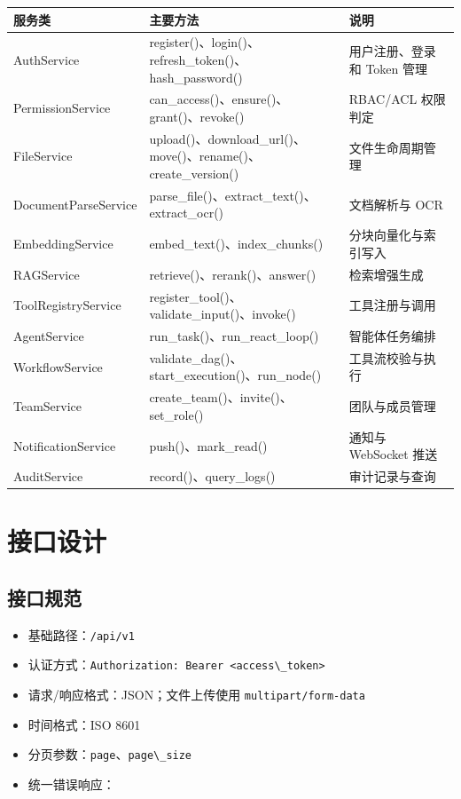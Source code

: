 \documentclass[a4paper,zihao=-4]{ctexart}
\providecommand{\tightlist}{%
  \setlength{\itemsep}{0pt}\setlength{\parskip}{0pt}}
\providecommand{\passthrough}[1]{#1}
\begin{document}
\begin{longtable}{|>{\raggedright\arraybackslash}p{2.4cm}|>{\raggedright\arraybackslash}p{\dimexpr(\linewidth-2.4cm-6\tabcolsep-4\arrayrulewidth)/2\relax}|>{\raggedright\arraybackslash}p{\dimexpr(\linewidth-2.4cm-6\tabcolsep-4\arrayrulewidth)/2\relax}|}
\hline
服务类 & 主要方法 & 说明\tabularnewline
\hline
\endhead
AuthService & register()、login()、refresh\_token()、hash\_password() & 用户注册、登录和 Token 管理\tabularnewline
\hline
PermissionService & can\_access()、ensure()、grant()、revoke() & RBAC/ACL 权限判定\tabularnewline
\hline
FileService & upload()、download\_url()、move()、rename()、create\_version() & 文件生命周期管理\tabularnewline
\hline
DocumentParseService & parse\_file()、extract\_text()、extract\_ocr() & 文档解析与 OCR\tabularnewline
\hline
EmbeddingService & embed\_text()、index\_chunks() & 分块向量化与索引写入\tabularnewline
\hline
RAGService & retrieve()、rerank()、answer() & 检索增强生成\tabularnewline
\hline
ToolRegistryService & register\_tool()、validate\_input()、invoke() & 工具注册与调用\tabularnewline
\hline
AgentService & run\_task()、run\_react\_loop() & 智能体任务编排\tabularnewline
\hline
WorkflowService & validate\_dag()、start\_execution()、run\_node() & 工具流校验与执行\tabularnewline
\hline
TeamService & create\_team()、invite()、set\_role() & 团队与成员管理\tabularnewline
\hline
NotificationService & push()、mark\_read() & 通知与 WebSocket 推送\tabularnewline
\hline
AuditService & record()、query\_logs() & 审计记录与查询\tabularnewline
\hline
\end{longtable}

\hypertarget{ux63a5ux53e3ux8bbeux8ba1}{%
\section{接口设计}\label{ux63a5ux53e3ux8bbeux8ba1}}

\hypertarget{ux63a5ux53e3ux89c4ux8303}{%
\subsection{接口规范}\label{ux63a5ux53e3ux89c4ux8303}}

\begin{itemize}
\tightlist
\item
  基础路径：\passthrough{\lstinline!/api/v1!}
\item
  认证方式：\passthrough{\lstinline!Authorization: Bearer <access\_token>!}
\item
  请求/响应格式：JSON；文件上传使用
  \passthrough{\lstinline!multipart/form-data!}
\item
  时间格式：ISO 8601
\item
  分页参数：\passthrough{\lstinline!page!}、\passthrough{\lstinline!page\_size!}
\item
  统一错误响应：
\end{itemize}
\end{document}
